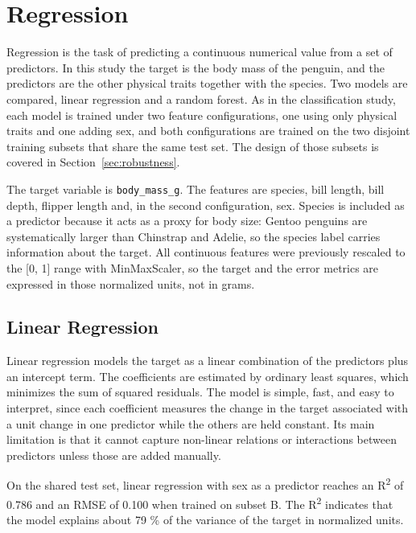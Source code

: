 \section{Regression}
\label{sec:regression}

Regression is the task of predicting a continuous numerical value from a set of predictors. In this study the target is the body mass of the penguin, and the predictors are the other physical traits together with the species. Two models are compared, linear regression and a random forest. As in the classification study, each model is trained under two feature configurations, one using only physical traits and one adding sex, and both configurations are trained on the two disjoint training subsets that share the same test set. The design of those subsets is covered in Section~\ref{sec:robustness}.

The target variable is \texttt{body\_mass\_g}. The features are species, bill length, bill depth, flipper length and, in the second configuration, sex. Species is included as a predictor because it acts as a proxy for body size: Gentoo penguins are systematically larger than Chinstrap and Adelie, so the species label carries information about the target. All continuous features were previously rescaled to the [0, 1] range with MinMaxScaler, so the target and the error metrics are expressed in those normalized units, not in grams.

\subsection{Linear Regression}

Linear regression models the target as a linear combination of the predictors plus an intercept term. The coefficients are estimated by ordinary least squares, which minimizes the sum of squared residuals. The model is simple, fast, and easy to interpret, since each coefficient measures the change in the target associated with a unit change in one predictor while the others are held constant. Its main limitation is that it cannot capture non-linear relations or interactions between predictors unless those are added manually.

On the shared test set, linear regression with sex as a predictor reaches an R\textsuperscript{2} of 0.786 and an RMSE of 0.100 when trained on subset B. The R\textsuperscript{2} indicates that the model explains about 79 \% of the variance of the target in normalized units.

